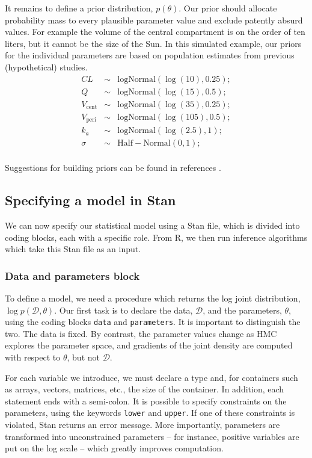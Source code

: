 It remains to define a prior distribution, $p(\theta)$.
Our prior should allocate probability mass to every plausible parameter value and exclude patently absurd values.
For example the volume of the central compartment is on the order of ten liters, but it cannot be the size of the Sun.
In this simulated example, our priors for the individual parameters are based on population estimates from previous (hypothetical) studies.
\begin{eqnarray*}
  CL & \sim & \mathrm{logNormal}(\log(10), 0.25);  \\
  Q & \sim & \mathrm{logNormal}(\log(15), 0.5); \\
  V_\mathrm{cent} & \sim & \mathrm{logNormal}(\log(35), 0.25); \\
  V_\mathrm{peri} & \sim & \mathrm{logNormal}(\log(105), 0.5); \\
  k_a & \sim & \mathrm{logNormal}(\log(2.5), 1); \\
  \sigma & \sim & \mathrm{Half-Normal}(0, 1); \\
\end{eqnarray*}


Suggestions for building priors can be found in references \cite{Gabry:2017, Betancourt:2020, author:0000}.

\subsection{Specifying a model in Stan}

We can now specify our statistical model using a Stan file, which is divided into coding blocks, each with a specific role.
From R, we then run inference algorithms which take this Stan file as an input.

\subsubsection{Data and parameters block}

To define a model, we need a procedure which returns the log joint distribution, $\log p(\mathcal D, \theta)$.
Our first task is to declare the data, $\mathcal D$, and the parameters, $\theta$, using the coding blocks \texttt{data} and \texttt{parameters}.
It is important to distinguish the two.
The data is fixed.
By contrast, the parameter values change as HMC explores the parameter space, and gradients of the joint density are computed with respect to $\theta$, but not $\mathcal D$.

For each variable we introduce, we must declare a type and, for containers such as arrays, vectors, matrices, etc., the size of the container.
In addition, each statement ends with a semi-colon.
It is possible to specify constraints on the parameters, using the keywords \texttt{lower} and \texttt{upper}.
If one of these constraints is violated, Stan returns an error message.
More importantly, parameters are transformed into unconstrained parameters -- for instance, positive variables are put on the log scale -- which greatly improves computation.

